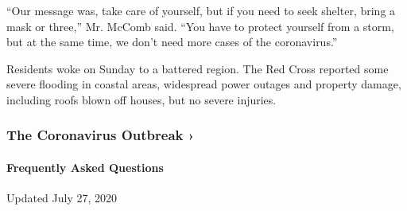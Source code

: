 ``Our message was, take care of yourself, but if you need to seek
shelter, bring a mask or three,'' Mr. McComb said. ``You have to protect
yourself from a storm, but at the same time, we don't need more cases of
the coronavirus.''

Residents woke on Sunday to a battered region. The Red Cross reported
some severe flooding in coastal areas, widespread power outages and
property damage, including roofs blown off houses, but no severe
injuries.

\href{https://www.nytimes.com/news-event/coronavirus?action=click\&pgtype=Article\&state=default\&region=MAIN_CONTENT_3\&context=storylines_faq}{}

\hypertarget{the-coronavirus-outbreak-}{%
\subsubsection{The Coronavirus Outbreak
›}\label{the-coronavirus-outbreak-}}

\hypertarget{frequently-asked-questions}{%
\paragraph{Frequently Asked
Questions}\label{frequently-asked-questions}}

Updated July 27, 2020

